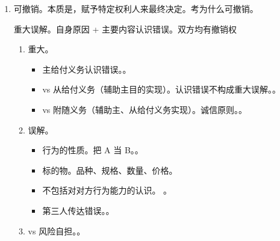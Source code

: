 \begin{enumerate}
\begin{enumerate}
\begin{enumerate}
\begin{enumerate}
                          \item 欠缺民事行为能力。。
                          \item {}。。
                        \end{enumerate}
                  \item 可撤销。本质是，赋予特定权利人来最终决定。考为什么可撤销。
                        \begin{kk}{重大误解。自身原因 + 主要内容认识错误。双方均有撤销权}
                          \begin{enumerate}
                            \item 重大。
                                  \begin{itemize}
                                    \item 主给付义务认识错误。。
                                    \item vs 从给付义务（辅助主目的实现）。认识错误不构成重大误解。。
                                    \item vs 附随义务（辅助主、从给付义务实现）。诚信原则。。
                                  \end{itemize}
                            \item 误解。
                                  \begin{itemize}
                                    \item 行为的性质。把 A 当 B。。
                                    \item 标的物。品种、规格、数量、价格。
                                    \item 不包括对对方行为能力的认识。
                                          。
                                    \item 第三人传达错误。。
                                  \end{itemize}
                            \item vs 风险自担。。
                          \end{enumerate}
                        \end{kk}


\end{enumerate}
\end{enumerate}
\end{enumerate}
